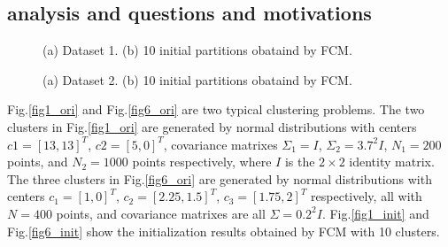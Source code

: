 \documentclass[journal]{IEEEtran}
\begin{document}
\subsection{analysis and questions and motivations}
\label{sec-2-2}
\begin{figure}[!t]
   \centering
   \quad
\caption{(a) Dataset 1. (b) 10 initial partitions obataind by FCM.}
\label{fig1}
\end{figure}
\begin{figure}[!t]
   \centering
   \quad
\caption{(a) Dataset 2. (b) 10 initial partitions obataind by FCM.}
\label{fig6}
\end{figure}
Fig.\ref{fig1_ori} and Fig.\ref{fig6_ori} are two typical clustering problems. The two clusters in Fig.\ref{fig1_ori} are generated by normal distributions with centers $c1=[13, 13]^T$, $c2=[5, 0]^T$, covariance matrixes $\Sigma_1=I$, $\Sigma_2=3.7^2I$, $N_1=200$ points, and $N_2=1000$ points  respectively, where $I$ is the $2\times 2$ identity matrix. The three clusters in Fig.\ref{fig6_ori} are generated by normal distributions with  centers $c_1=[1, 0]^T$, $c_2=[2.25, 1.5]^T$, $c_3=[1.75, 2]^T$ respectively, all with $N=400$ points, and covariance matrixes are all $\Sigma=0.2^2I$. Fig.\ref{fig1_init} and Fig.\ref{fig6_init} show the initialization results obtained by FCM with 10 clusters.
\end{document}
